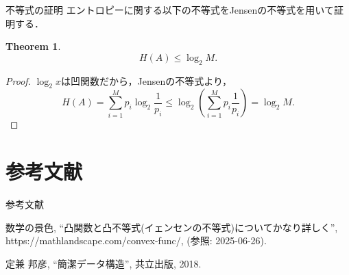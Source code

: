 \documentclass[dvipdfmx,aspectratio=169]{beamer}
\theoremstyle{plain}
\newtheorem{thm}{Theorem}
\theoremstyle{definition}
\begin{document}

\begin{frame}{不等式の証明}
    エントロピーに関する以下の不等式をJensenの不等式を用いて証明する．
    \begin{thm}
        \[
        H(A) \le \log_2 M.
        \]
    \end{thm}

    \begin{proof}
        $\log_2 x$は凹関数だから，Jensenの不等式より，
        \[
            H(A) = \sum_{i=1}^M p_{i} \log_2 \frac{1}{p_{i}} \le \log_2 (\sum_{i=1}^M p_{i} \frac{1}{p_{i}}) = \log_2 M.
        \]
    \end{proof}
\end{frame}

\section*{参考文献}
\begin{frame}{参考文献}
\begin{thebibliography}{9}
\renewcommand{\baselinestretch}{1.0}
\small
\beamertemplatetextbibitems
{}
    数学の景色,
    ``凸関数と凸不等式(イェンセンの不等式)についてかなり詳しく'',
    https://mathlandscape.com/convex-func/,
    (参照: 2025-06-26).

    定兼 邦彦,
    ``簡潔データ構造'',
    共立出版, 2018.

\end{thebibliography}
\end{frame}
\end{document}
